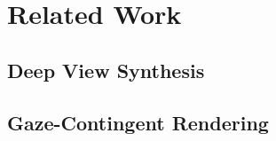 \section{Related Work}
\label{sec:prior}

\subsection{Deep View Synthesis}

\subsection{Gaze-Contingent Rendering}
\cite{Guenter:2012:F3G,Patney:2016:TFR,Sun:2017:PGF,Kaplanyan:2019:DNR}